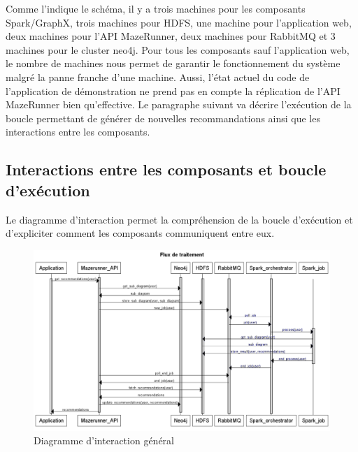 Comme l'indique le schéma, il y a trois machines pour les composants Spark/GraphX, trois machines pour HDFS, une machine pour l'application web, deux machines pour l'API MazeRunner, deux machines pour RabbitMQ et 3 machines pour le cluster neo4j.
Pour tous les composants sauf l'application web, le nombre de machines nous permet de garantir le fonctionnement du système malgré la panne franche d'une machine. Aussi, l'état actuel du code de l'application de démonstration ne prend pas en compte la réplication de l'API MazeRunner bien qu'effective.
Le paragraphe suivant va décrire l'exécution de la boucle permettant de générer de nouvelles recommandations ainsi que les interactions entre les composants.

\subsection{Interactions entre les composants et boucle d'exécution}

Le diagramme d'interaction permet la compréhension de la boucle d'exécution et d'expliciter comment les composants communiquent entre eux.

\begin{figure}[h]
    \centering
    \includegraphics[scale=0.4]{pics/diagramme_interaction.png}
    \caption{Diagramme d'interaction général}
\end{figure}
\FloatBarrier

